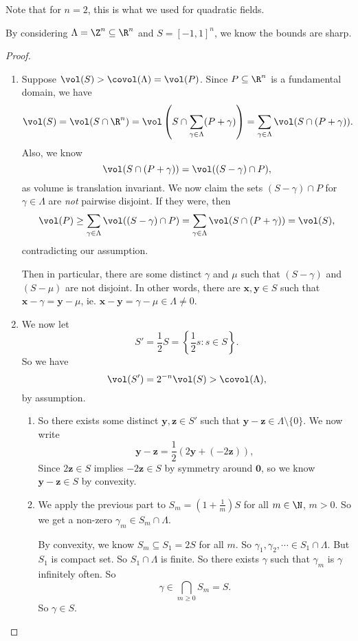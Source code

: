 \documentclass[a4paper]{article}
\begin{document}
Note that for $n = 2$, this is what we used for quadratic fields.

By considering $\Lambda = \Z^n \subseteq \R^n$ and $S = [-1, 1]^n$, we know the bounds are sharp.

\begin{proof}\leavevmode
  \begin{enumerate}
    \item Suppose $\vol(S) > \covol(\Lambda) = \vol(P)$. Since $P \subseteq \R^n$ is a fundamental domain, we have
      \[
        \vol(S) = \vol(S \cap \R^n) = \vol\left(S \cap \sum_{\gamma \in \Lambda} (P + \gamma)\right) = \sum_{\gamma \in \Lambda} \vol(S \cap (P + \gamma)).
      \]
      Also, we know
      \[
        \vol(S \cap (P + \gamma)) = \vol((S - \gamma) \cap P),
      \]
      as volume is translation invariant. We now claim the sets $(S - \gamma) \cap P$ for $\gamma \in \Lambda$ are \emph{not} pairwise disjoint. If they were, then
      \[
        \vol(P) \geq \sum_{\gamma \in \Lambda} \vol((S - \gamma) \cap P) = \sum_{\gamma \in \Lambda} \vol(S \cap (P + \gamma)) = \vol(S),
      \]
      contradicting our assumption.

      Then in particular, there are some distinct $\gamma$ and $\mu$ such that $(S - \gamma)$ and $(S - \mu)$ are not disjoint. In other words, there are $\mathbf{x}, \mathbf{y} \in S$ such that $\mathbf{x} - \gamma = \mathbf{y} - \mu$, ie. $\mathbf{x} - \mathbf{y} = \gamma - \mu \in \Lambda \not= 0$.
    \item We now let
      \[
        S' = \frac{1}{2} S = \left\{\frac{1}{2}s: s \in S\right\}.
      \]
      So we have
      \[
        \vol(S') = 2^{-n} \vol(S) > \covol(\Lambda),
      \]
      by assumption.
      \begin{enumerate}
        \item So there exists some distinct $\mathbf{y}, \mathbf{z} \in S'$ such that $\mathbf{y} - \mathbf{z} \in \Lambda \setminus \{0\}$. We now write
          \[
            \mathbf{y} - \mathbf{z} = \frac{1}{2} (2\mathbf{y} + (-2\mathbf{z})),
          \]
          Since $2\mathbf{z} \in S$ implies $-2\mathbf{z} \in S$ by symmetry around $\mathbf{0}$, so we know $\mathbf{y} - \mathbf{z} \in S$ by convexity.
        \item We apply the previous part to $S_m = \left(1 + \frac{1}{m}\right)S$ for all $m \in \N$, $m > 0$. So we get a non-zero $\gamma_m \in S_m \cap \Lambda$.

          By convexity, we know $S_m \subseteq S_1 = 2S$ for all $m$. So $\gamma_1, \gamma_2, \cdots \in S_1 \cap \Lambda$. But $S_1$ is compact set. So $S_1 \cap \Lambda$ is finite. So there exists $\gamma$ such that $\gamma_m$ is $\gamma$ infinitely often. So
          \[
            \gamma \in \bigcap_{m \geq 0} S_m = S.
          \]
          So $\gamma \in S$.
      \end{enumerate}
  \end{enumerate}
\end{proof}
\end{document}
